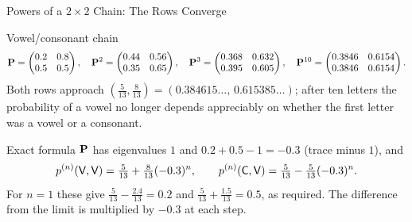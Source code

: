 \begin{frame}{Powers of a $2\times2$ Chain: The Rows Converge}
  \label{fr:twobytwo}
  \small
  \begin{exampleblock}{Vowel/consonant chain}
    \[
      \mathbf{P}=\begin{pmatrix}0.2&0.8\\0.5&0.5\end{pmatrix},\quad
      \mathbf{P}^2=\begin{pmatrix}0.44&0.56\\0.35&0.65\end{pmatrix},\quad
      \mathbf{P}^3=\begin{pmatrix}0.368&0.632\\0.395&0.605\end{pmatrix},\quad
      \mathbf{P}^{10}=\begin{pmatrix}0.3846&0.6154\\0.3846&0.6154\end{pmatrix}.
    \]
    Both rows approach $(\tfrac5{13},\tfrac8{13})=(0.384615\ldots,\,0.615385\ldots)$; after ten letters the probability of a vowel no longer depends appreciably on whether the first letter was a vowel or a consonant.
  \end{exampleblock}
  \begin{block}{Exact formula}
    $\mathbf{P}$ has eigenvalues $1$ and $0.2+0.5-1=-0.3$ (trace minus $1$), and
    \[
      p^{(n)}(\mathsf{V},\mathsf{V})=\tfrac5{13}+\tfrac8{13}(-0.3)^n,\qquad p^{(n)}(\mathsf{C},\mathsf{V})=\tfrac5{13}-\tfrac5{13}(-0.3)^n .
    \]
    For $n=1$ these give $\tfrac5{13}-\tfrac{2.4}{13}=0.2$ and $\tfrac5{13}+\tfrac{1.5}{13}=0.5$, as required. The difference from the limit is multiplied by $-0.3$ at each step.
  \end{block}
\end{frame}


